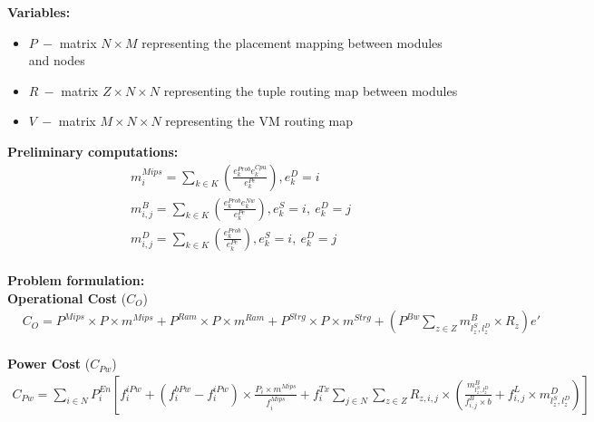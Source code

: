 \documentclass{article}
\begin{document}
\pagebreak
\noindent\textbf{Variables:}
\begin{itemize}
	\item $P~-$ matrix $N\times M$ representing the placement mapping between modules and nodes
	\item $R~-$ matrix $Z\times N\times N$ representing the tuple routing map between modules
	\item $V~-$ matrix $M\times N\times N$ representing the VM routing map
\end{itemize}
\vspace*{12pt}

\noindent\textbf{Preliminary computations:}\\[6pt]
\begin{equation*}
\begin{split}
& m^{Mips}_{i} = \sum_{k\in K} \left(\frac{e^{Prob}_k e^{Cpu}_k}{e^{Pe}_k}\right), e_k^{D} = i\\[6pt]
& m^B_{i,j}= \sum_{k\in K} \left(\frac{e^{Prob}_k e^{Nw}_k}{e^{Pe}_k}\right), e^{S}_k = i,~e^{D}_k = j\\[6pt]
& m^D_{i,j}= \sum_{k\in K} \left(\frac{e^{Prob}_k}{e^{Pe}_k}\right), e^{S}_k = i,~e^{D}_k = j
\end{split}
\end{equation*}\\[6pt]

\noindent\textbf{Problem formulation:}\\[12pt]
\noindent\textbf{Operational Cost} ($C_O$)\\[6pt]
\begin{equation*}
\begin{split}
	& C_O = P^{Mips} \times P \times m^{Mips} + P^{Ram} \times P \times m^{Ram} + P^{Strg}\times P\times m^{Strg} + \left(P^{Bw} \sum_{z\in Z} m^B_{l^S_z,l^D_z} \times R_z\right)e'
\end{split}
\end{equation*}\\[6pt]

\noindent\textbf{Power Cost} ($C_{Pw}$)\\[6pt]
\begin{equation*}
\begin{aligned}
C_{Pw} = \sum_{i\in N} P^{En}_i \left[ f_i^{iPw} + (f_i^{bPw} - f_i^{iPw}) \times\frac{P_i \times m^{Mips}}{f_i^{Mips}} + f^{Tx}_{i} \sum_{j\in N}\sum_{z\in Z} R_{z, i,j} \times \left(\frac{ m^B_{l^S_z,l^D_z}}{f^B_{i,j}\times b} + f^L_{i,j} \times m^D_{l_z^S, l_z^D} \right) \right]
\end{aligned}
\end{equation*}\\[6pt]
\end{document}
